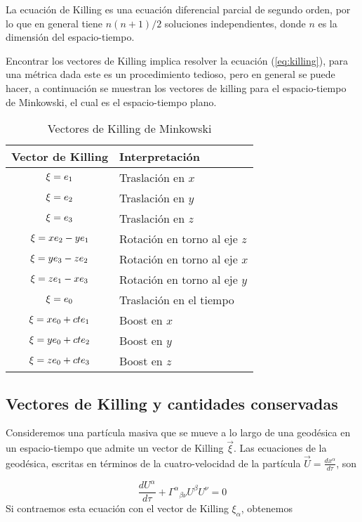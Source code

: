 \begin{note}
    La ecuación de Killing es una ecuación diferencial parcial de segundo orden, por lo que en general tiene $n(n+1)/2$ soluciones independientes, donde $n$ es la dimensión del espacio-tiempo.
\end{note}
Encontrar los vectores de Killing implica resolver la ecuación (\ref{eq:killing}), para una métrica dada este es un procedimiento tedioso, pero en general se puede hacer, a continuación se muestran los vectores de killing para el espacio-tiempo de Minkowski, el cual es el espacio-tiempo plano.

\begin{table}[H]
\centering
\begin{tabular}{c|l}
\hline
\textbf{Vector de Killing} & \textbf{Interpretación} \\ \hline
$\mathbf{\xi}=e_1$ & Traslación en $x$ \\ \hline
$\mathbf{\xi}=e_2$ & Traslación en $y$ \\ \hline
$\mathbf{\xi}=e_3$ & Traslación en $z$ \\ \hline
$\mathbf{\xi}=x e_2-y e_1$ & Rotación en torno al eje $z$ \\ \hline
$\mathbf{\xi}=y e_3-z e_2$ & Rotación en torno al eje $x$ \\ \hline
$\mathbf{\xi}=z e_1-x e_3$ & Rotación en torno al eje $y$ \\ \hline
$\mathbf{\xi}=e_0$ & Traslación en el tiempo \\ \hline
$\mathbf{\xi}=x e_0+c t e_1$ & Boost en $x$ \\ \hline
$\mathbf{\xi}=y e_0+c t e_2$ & Boost en $y$ \\ \hline
$\mathbf{\xi}=z e_0+c t e_3$ & Boost en $z$ \\ \hline
\end{tabular}
\caption{Vectores de Killing de Minkowski}
\end{table}

\subsection{Vectores de Killing y cantidades conservadas}
Consideremos una partícula masiva que se mueve a lo largo de una geodésica en un espacio-tiempo que admite un vector de Killing $\vec{\xi}$. Las ecuaciones de la geodésica, escritas en términos de la cuatro-velocidad de la partícula $\vec{U}=\frac{d x^\alpha}{d \tau}$, son

\begin{equation}
\frac{d U^\alpha}{d \tau}+\Gamma^\alpha{ }_{\beta \nu} U^\beta U^\nu=0
\label{eq:geodesicaU}
\end{equation}
Si contraemos esta ecuación con el vector de Killing $\xi_\alpha$, obtenemos

